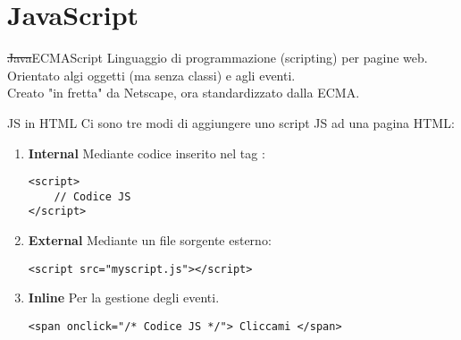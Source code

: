 \section{JavaScript}
\begin{frame}[fragile]{\sout{Java}ECMAScript}\transfade\centering
  Linguaggio di programmazione (scripting) per pagine web.\\\bigskip\pause
  Orientato algi oggetti (ma senza classi) e agli eventi.\\\bigskip\pause
  Creato "in fretta" da Netscape, ora standardizzato dalla ECMA.\\
\end{frame}

\begin{frame}[fragile]{JS in HTML}\transfade\centering
  Ci sono tre modi di aggiungere uno script JS ad una pagina HTML:
  \begin{enumerate}[<+(1)->]
    \item \textbf{Internal} Mediante codice inserito nel tag :
    \begin{verbatim}
<script>
    // Codice JS
</script>
    \end{verbatim}
    \item \textbf{External} Mediante un file sorgente esterno:
    \begin{verbatim}
<script src="myscript.js"></script>
    \end{verbatim}
    \item \textbf{Inline} Per la gestione degli eventi.
    \begin{verbatim}
<span onclick="/* Codice JS */"> Cliccami </span>
    \end{verbatim}
  \end{enumerate}
  \\
\end{frame}